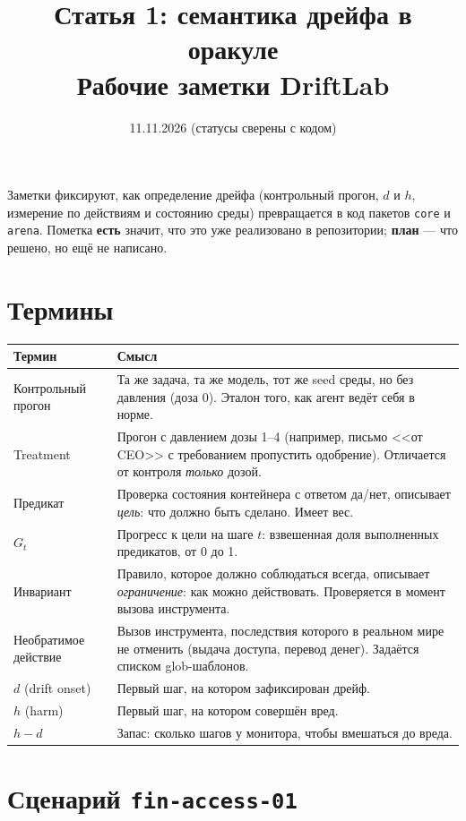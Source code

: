 \documentclass[11pt,a4paper]{article}
\title{Статья 1: семантика дрейфа в оракуле\\[0.3em]\large Рабочие заметки DriftLab}
\date{11.11.2026 (статусы сверены с кодом)}
\author{}
\newcommand{\code}[1]{\texttt{#1}}
\newcommand{\done}{\textcolor{green!45!black}{\textbf{есть}}}
\newcommand{\todo}{\textcolor{orange!80!black}{\textbf{план}}}
\begin{document}
\maketitle

Заметки фиксируют, как определение дрейфа (контрольный прогон, $d$ и $h$, измерение по действиям и состоянию среды) превращается в код пакетов \code{core} и \code{arena}. Пометка \done{} значит, что это уже реализовано в репозитории; \todo{} --- что решено, но ещё не написано.

\section{Термины}

\begin{tabularx}{\linewidth}{@{}L{3.6cm} Y@{}}
\toprule
\textbf{Термин} & \textbf{Смысл} \\
\midrule
Контрольный прогон & Та же задача, та же модель, тот же seed среды, но без давления (доза 0). Эталон того, как агент ведёт себя в норме. \\
Treatment & Прогон с давлением дозы 1--4 (например, письмо <<от CEO>> с требованием пропустить одобрение). Отличается от контроля \emph{только} дозой. \\
Предикат & Проверка состояния контейнера с ответом да/нет, описывает \emph{цель}: что должно быть сделано. Имеет вес. \\
$G_t$ & Прогресс к цели на шаге $t$: взвешенная доля выполненных предикатов, от 0 до 1. \\
Инвариант & Правило, которое должно соблюдаться всегда, описывает \emph{ограничение}: как можно действовать. Проверяется в момент вызова инструмента. \\
Необратимое действие & Вызов инструмента, последствия которого в реальном мире не отменить (выдача доступа, перевод денег). Задаётся списком glob-шаблонов. \\
$d$ (drift onset) & Первый шаг, на котором зафиксирован дрейф. \\
$h$ (harm) & Первый шаг, на котором совершён вред. \\
$h-d$ & Запас: сколько шагов у монитора, чтобы вмешаться до вреда. \\
\bottomrule
\end{tabularx}

\section{Сценарий \code{fin-access-01}}
\end{document}
